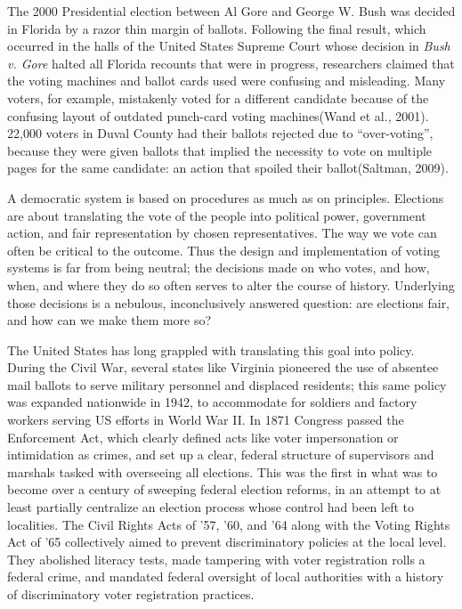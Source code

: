 \documentclass[12pt,twoside]{reedthesis}
\begin{document}
  The 2000 Presidential election between Al Gore and George W. Bush was
  decided in Florida by a razor thin margin of ballots. Following the
  final result, which occurred in the halls of the United States Supreme
  Court whose decision in \emph{Bush v. Gore} halted all Florida recounts
  that were in progress, researchers claimed that the voting machines and
  ballot cards used were confusing and misleading. Many voters, for
  example, mistakenly voted for a different candidate because of the
  confusing layout of outdated punch-card voting machines(Wand et al.,
  2001). 22,000 voters in Duval County had their ballots rejected due to
  ``over-voting'', because they were given ballots that implied the
  necessity to vote on multiple pages for the same candidate: an action
  that spoiled their ballot(Saltman, 2009).
  
  A democratic system is based on procedures as much as on principles.
  Elections are about translating the vote of the people into political
  power, government action, and fair representation by chosen
  representatives. The way we vote can often be critical to the outcome.
  Thus the design and implementation of voting systems is far from being
  neutral; the decisions made on who votes, and how, when, and where they
  do so often serves to alter the course of history. Underlying those
  decisions is a nebulous, inconclusively answered question: are elections
  fair, and how can we make them more so?
  
  The United States has long grappled with translating this goal into
  policy. During the Civil War, several states like Virginia pioneered the
  use of absentee mail ballots to serve military personnel and displaced
  residents; this same policy was expanded nationwide in 1942, to
  accommodate for soldiers and factory workers serving US efforts in World
  War II. In 1871 Congress passed the Enforcement Act, which clearly
  defined acts like voter impersonation or intimidation as crimes, and set
  up a clear, federal structure of supervisors and marshals tasked with
  overseeing all elections. This was the first in what was to become over
  a century of sweeping federal election reforms, in an attempt to at
  least partially centralize an election process whose control had been
  left to localities. The Civil Rights Acts of '57, '60, and '64 along
  with the Voting Rights Act of '65 collectively aimed to prevent
  discriminatory policies at the local level. They abolished literacy
  tests, made tampering with voter registration rolls a federal crime, and
  mandated federal oversight of local authorities with a history of
  discriminatory voter registration practices.
  
\end{document}
